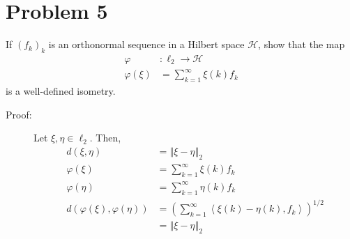 \documentclass[8pt]{extarticle}
\newcommand{\iprod}[2]{\left\langle #1,#2\right\rangle}
\newcommand{\norm}[1]{\left\Vert #1\right\Vert}
\begin{document}
  \section{Problem 5}%
  If $(f_k)_k$ is an orthonormal sequence in a Hilbert space $\mathcal{H}$, show that the map
  \begin{align*}
    \varphi&: \ell_2 \rightarrow \mathcal{H}\\
    \varphi(\xi) &= \sum_{k=1}^{\infty}\xi(k)f_k
  \end{align*}
  is a well-defined isometry.
  \begin{description}
    \item[Proof:] Let $\xi,\eta\in \ell_2$. Then,
      \begin{align*}
        d(\xi,\eta) &= \norm{\xi-\eta}_2\\
        \varphi(\xi) &= \sum_{k=1}^{\infty}\xi(k)f_k\\
        \varphi(\eta) &= \sum_{k=1}^{\infty}\eta(k)f_k\\
        d(\varphi(\xi),\varphi(\eta)) &= \left(\sum_{k=1}^{\infty}\iprod{\xi(k)-\eta(k)}{f_k}\right)^{1/2}\\
                                      &=\norm{\xi - \eta}_2 \tag*{Parseval's Identity.}
      \end{align*}
  \end{description}
\end{document}
